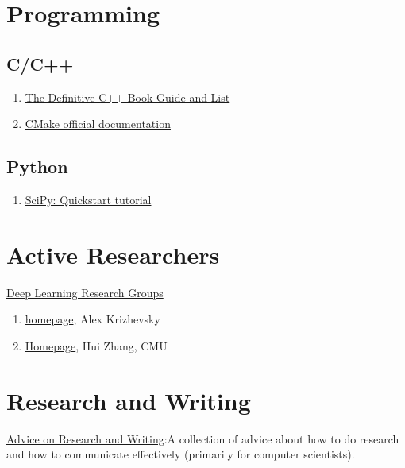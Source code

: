 \documentclass{article}
\begin{document}
\section{Programming}
\subsection{C/C++}
\begin{enumerate}
	\item \href{http://stackoverflow.com/questions/388242/the-definitive-c-book-guide-and-list}{The Definitive C++ Book Guide and List}
	\item \href{https://github.com/onqtam/awesome-cmake}{CMake official documentation}
\end{enumerate}
\subsection{Python}
\begin{enumerate}
	\item \href{https://docs.scipy.org/doc/numpy-dev/user/quickstart.html}{SciPy: Quickstart tutorial}
\end{enumerate}


\section{Active Researchers}
\href{http://deeplearning.net/deep-learning-research-groups-and-labs/}{Deep Learning Research Groups}
\begin{enumerate}
	\item \href{http://www.cs.toronto.edu/~kriz/}{homepage}, Alex Krizhevsky
	\item \href{http://www.cs.cmu.edu/~hzhang/}{Homepage}, Hui Zhang, CMU
\end{enumerate}


\section{Research and Writing}
\href{http://www.cs.cmu.edu/afs/cs.cmu.edu/user/mleone/web/how-to.html}{Advice on Research and Writing}:A collection of advice about how to do research and how to communicate effectively (primarily for computer scientists).


\newpage
\printbibliography
\end{document}
